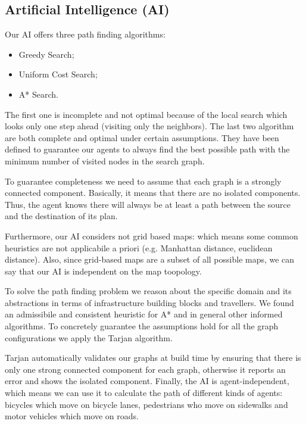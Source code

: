 \subsection{Artificial Intelligence (AI)}

Our AI offers three path finding algorithms:
\begin{itemize}
  \item Greedy Search;
  \item Uniform Cost Search;
  \item A* Search.
\end{itemize}

The first one is incomplete and not optimal because of the local search which looks only one step ahead (visiting
only the neighbors). The last two algorithm are both complete and optimal under certain assumptions. They have been defined
to guarantee our agents to always find the best possible path with the minimum number of visited nodes in the search graph.

To guarantee completeness we need to assume that each graph is a strongly
connected component. Basically, it means that there are no isolated
components. Thus, the agent knows there will always be at least a path between
the source and the destination of its plan. %

Furthermore, our AI considers not grid based maps: which means some common
heuristics are not applicabile a priori (e.g. Manhattan distance, euclidean
distance). Also, since grid-based maps are a subset of all possible maps, we
can say that our AI is independent on the map toopology.

To solve the path finding problem we reason about the specific domain and its
abstractions in terms of infrastructure building blocks and travellers. We
found an admissibile and consistent heuristic for A* and in general other
informed algorithms. To concretely guarantee the assumptions hold for all the
graph configurations we apply the Tarjan algorithm.

Tarjan automatically validates our graphs at build time by ensuring that there
is only one strong connected component for each graph, otherwise it reports
an error and shows the isolated component.
Finally, the AI is agent-independent, which means we can use it to calculate
the path of different kinds of agents: bicycles which move on bicycle lanes,
pedestrians who move on sidewalks and motor vehicles which move on roads.

